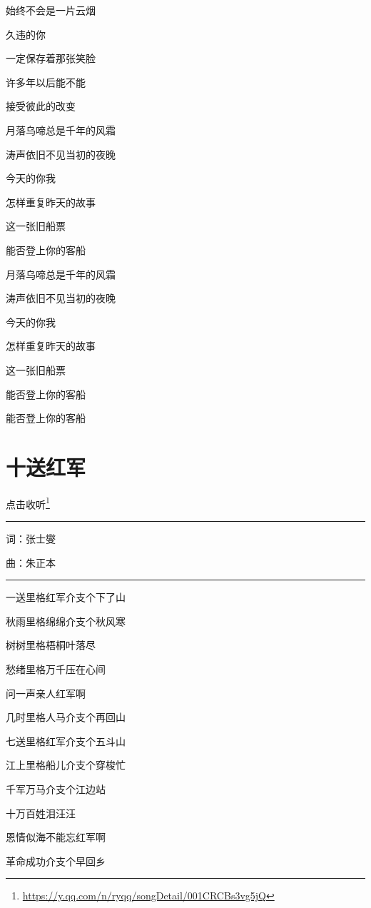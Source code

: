 \documentclass[]{ctexbook}
\renewcommand{\href}[2]{#2\footnote{\url{#1}}}
\begin{document}
始终不会是一片云烟

久违的你

一定保存着那张笑脸

许多年以后能不能

接受彼此的改变

月落乌啼总是千年的风霜

涛声依旧不见当初的夜晚

今天的你我

怎样重复昨天的故事

这一张旧船票

能否登上你的客船

月落乌啼总是千年的风霜

涛声依旧不见当初的夜晚

今天的你我

怎样重复昨天的故事

这一张旧船票

能否登上你的客船

能否登上你的客船

\section*{十送红军}\label{Seeing-off-the-Red-Amy}


\href{https://y.qq.com/n/ryqq/songDetail/001CRCBs3vg5jQ}{点击收听}

\begin{center}\rule{0.5\linewidth}{0.5pt}\end{center}

词：张士燮

曲：朱正本

\begin{center}\rule{0.5\linewidth}{0.5pt}\end{center}

一送里格红军介支个下了山

秋雨里格绵绵介支个秋风寒

树树里格梧桐叶落尽

愁绪里格万千压在心间

问一声亲人红军啊

几时里格人马介支个再回山

七送里格红军介支个五斗山

江上里格船儿介支个穿梭忙

千军万马介支个江边站

十万百姓泪汪汪

恩情似海不能忘红军啊

革命成功介支个早回乡
\end{document}
